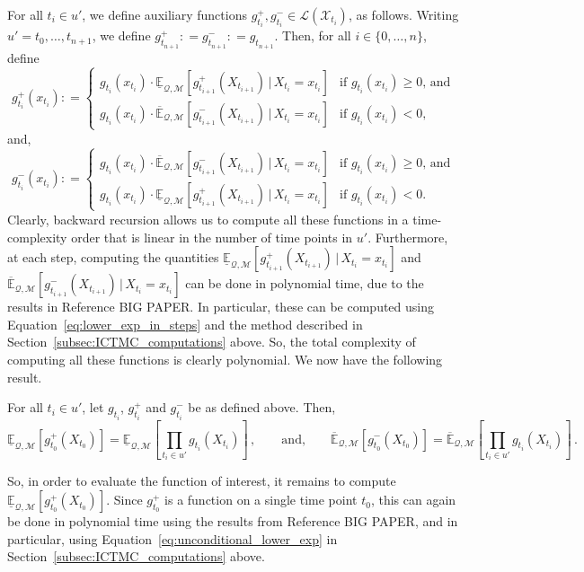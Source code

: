 \documentclass[twoside,11pt]{article}
\newcommand{\states}{\mathcal{X}}
\newcommand{\lexp}{\underline{\mathbb{E}}_{\rateset,\mathcal{M}}}
\newcommand{\uexp}{\overline{\mathbb{E}}_{\rateset,\mathcal{M}}}
\newcommand{\gambles}{\mathcal{L}}
\newcommand{\rateset}{\mathcal{Q}}
\newcommand{\coloneqq}{:\!=}
\begin{document}
For all $t_i\in u'$, we define auxiliary functions $g_{t_i}^+,g_{t_i}^-\in\gambles(\states_{t_i})$, as follows. Writing $u'=t_0,\ldots,t_{n+1}$, we define $g_{t_{n+1}}^+\coloneqq g_{t_{n+1}}^-\coloneqq g_{t_{n+1}}$. Then, for all $i\in\{0,\ldots,n\}$, define
\begin{equation*}
g_{t_i}^+(x_{t_i}) \coloneqq \left\{\begin{array}{ll}
g_{t_i}(x_{t_i})\cdot\lexp[g_{t_{i+1}}^+(X_{t_{i+1}})\,\vert\, X_{t_i}=x_{t_i}] & \text{if $g_{t_i}(x_{t_i})\geq 0$, and} \\
g_{t_i}(x_{t_i})\cdot\uexp[g_{t_{i+1}}^-(X_{t_{i+1}})\,\vert\, X_{t_i}=x_{t_i}] & \text{if $g_{t_i}(x_{t_i})<0$,}
\end{array}\right.
\end{equation*}
and,
\begin{equation*}
g_{t_i}^-(x_{t_i}) \coloneqq \left\{\begin{array}{ll}
g_{t_i}(x_{t_i})\cdot\uexp[g_{t_{i+1}}^-(X_{t_{i+1}})\,\vert\, X_{t_i}=x_{t_i}] & \text{if $g_{t_i}(x_{t_i})\geq 0$, and} \\
g_{t_i}(x_{t_i})\cdot\lexp[g_{t_{i+1}}^+(X_{t_{i+1}})\,\vert\, X_{t_i}=x_{t_i}] & \text{if $g_{t_i}(x_{t_i})<0$.}
\end{array}\right.
\end{equation*}
Clearly, backward recursion allows us to compute all these functions in a time-complexity order that is linear in the number of time points in $u'$. Furthermore, at each step, computing the quantities $\lexp[g_{t_{i+1}}^+(X_{t_{i+1}})\,\vert\, X_{t_i}=x_{t_i}]$ and $\uexp[g_{t_{i+1}}^-(X_{t_{i+1}})\,\vert\, X_{t_i}=x_{t_i}]$ can be done in polynomial time, due to the results in Reference BIG PAPER. In particular, these can be computed using Equation~\eqref{eq:lower_exp_in_steps} and the method described in Section~\ref{subsec:ICTMC_computations} above. So, the total complexity of computing all these functions is clearly polynomial. We now have the following result.
\begin{proposition}\label{prop:computing_product_funcs}
For all $t_i\in u'$, let $g_{t_i}$, $g_{t_i}^+$ and $g_{t_i}^-$ be as defined above. Then,
\begin{equation*}
\lexp\left[g_{t_0}^+(X_{t_0})\right] = \lexp\left[\prod_{t_i\in u'}g_{t_i}(X_{t_i})\right]\,,\quad\quad\text{and,}\quad\quad\uexp\left[g_{t_0}^-(X_{t_0})\right] = \uexp\left[\prod_{t_i\in u'}g_{t_i}(X_{t_i})\right]\,.
\end{equation*}
\end{proposition}
So, in order to evaluate the function of interest, it remains to compute $\lexp\left[g_{t_0}^+(X_{t_0})\right]$. Since $g_{t_0}^+$ is a function on a single time point $t_0$, this can again be done in polynomial time using the results from Reference BIG PAPER, and in particular, using Equation~\eqref{eq:unconditional_lower_exp} in Section~\ref{subsec:ICTMC_computations} above.
\end{document}
